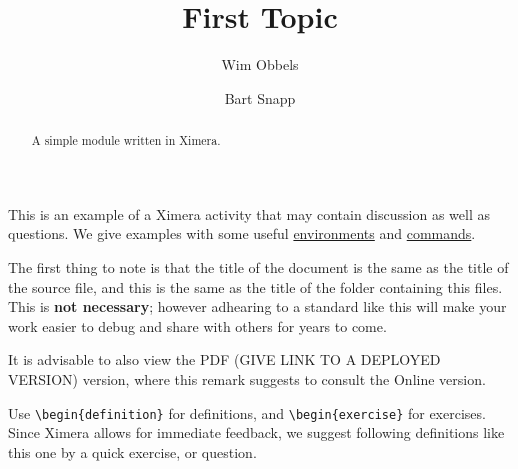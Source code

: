 \documentclass{ximera}
\author{Wim Obbels \and Bart Snapp}
\title{First Topic}
\begin{document}
\begin{abstract}
    A simple module written in Ximera.
\end{abstract}
\maketitle
\label{xim:ximeraDemo}

This is an example of a Ximera activity that may contain discussion as well as
questions. We give examples
with some useful \hyperref[xim:ximeraEnvironments]{environments} and
\hyperref[xim:ximeraCommands]{commands}.

The first thing to note is that the title of the document is the same as the
title of the source file, and this is the same as the title of the folder
containing this files.
This is \textbf{not necessary}; however adhearing to a standard like this will
make your work easier to debug and share with others for years to come.

\begin{onlineOnly}
    \begin{remark}
        It is advisable to also view the PDF (GIVE LINK TO A DEPLOYED VERSION)
        version, where this remark
        suggests to
        consult the Online version.
    \end{remark}
\end{onlineOnly}

Use \verb|\begin{definition}| for definitions, and \verb|\begin{exercise}| for
exercises. Since Ximera allows for immediate feedback, we suggest following
definitions like this one by a quick exercise, or question.
\end{document}

